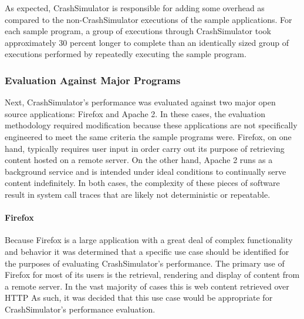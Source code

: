             As expected, CrashSimulator is responsible for adding some overhead as compared to the non-CrashSimulator
            executions of the sample applications. For each sample program, a group of executions through CrashSimulator
            took approximately 30 percent longer to complete than an identically sized group of executions performed by
            repeatedly executing the sample program.

        \subsubsection{Evaluation Against Major Programs}

            Next, CrashSimulator's performance was evaluated against two major open source applications: Firefox and
            Apache 2. In these cases, the evaluation methodology required modification because these applications are
            not specifically engineered to meet the same criteria the sample programs were. Firefox, on one hand,
            typically requires user input in order carry out its purpose of retrieving content hosted on a remote
            server. On the other hand, Apache 2 runs as a background service and is intended under ideal conditions to
            continually serve content indefinitely. In both cases, the complexity of these pieces of software result in
            system call traces that are likely not deterministic or repeatable.

            \paragraph{Firefox}

                Because Firefox is a large application with a great deal of complex functionality and behavior it was
                determined that a specific use case should be identified for the purposes of evaluating CrashSimulator's
                performance. The primary use of Firefox for most of its users is the retrieval, rendering and display of
                content from a remote server. In the vast majority of cases this is web content retrieved over HTTP As
                such, it was decided that this use case would be appropriate for CrashSimulator's performance
                evaluation.


